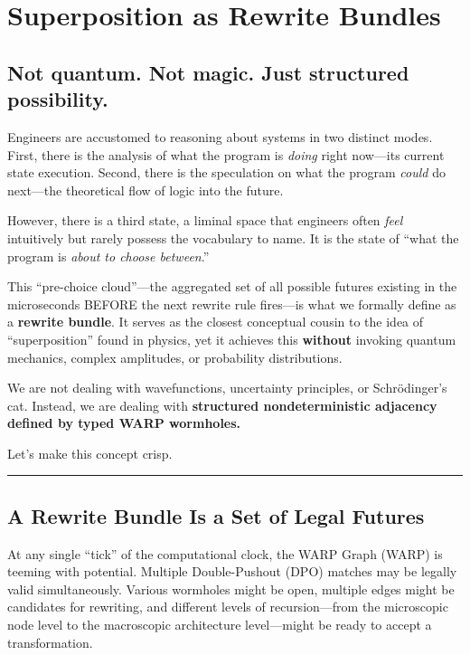 \chapter{Superposition as Rewrite Bundles}
\label{chapter-11-rewrite-bundles}

\section{\texorpdfstring{\textbf{Not quantum. Not magic. Just structured possibility.}}{11.0 --- Not quantum. Not magic. Just structured possibility.}}

Engineers are accustomed to reasoning about systems in two distinct modes. First, there is the analysis of what the program is \emph{doing} right now—its current state execution. Second, there is the speculation on what the program \emph{could} do next—the theoretical flow of logic into the future.

However, there is a third state, a liminal space that engineers often \emph{feel} intuitively but rarely possess the vocabulary to name. It is the state of ``what the program is \emph{about to choose between}.''

This ``pre-choice cloud''—the aggregated set of all possible futures existing in the microseconds BEFORE the next rewrite rule fires—is what we formally define as a \textbf{rewrite bundle}. It serves as the closest conceptual cousin to the idea of ``superposition'' found in physics, yet it achieves this \textbf{without} invoking quantum mechanics, complex amplitudes, or probability distributions.

We are not dealing with wavefunctions, uncertainty principles, or Schrödinger's cat. Instead, we are dealing with \textbf{structured nondeterministic adjacency defined by typed WARP wormholes.}

Let's make this concept crisp.

\begin{center}\rule{0.5\linewidth}{0.5pt}\end{center}

\section{\texorpdfstring{\textbf{A Rewrite Bundle Is a Set of Legal Futures}}{11.1 --- A Rewrite Bundle Is a Set of Legal Futures}}

At any single ``tick'' of the computational clock, the WARP Graph (WARP) is teeming with potential. Multiple Double-Pushout (DPO) matches may be legally valid simultaneously. Various wormholes might be open, multiple edges might be candidates for rewriting, and different levels of recursion—from the microscopic node level to the macroscopic architecture level—might be ready to accept a transformation.

